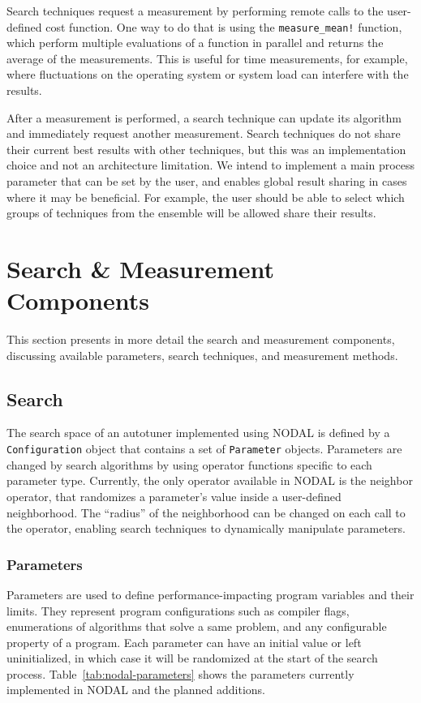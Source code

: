 Search techniques request a measurement by performing remote calls to the
user-defined cost function. One way to do that is using the
\texttt{measure\_mean!} function, which perform multiple evaluations of a
function in parallel and returns the average of the measurements.  This is
useful for time measurements, for example, where fluctuations on the operating
system or system load can interfere with the results.

After a measurement is performed, a search technique can update its algorithm
and immediately request another measurement.  Search techniques do not share
their current best results with other techniques, but this was an
implementation choice and not an architecture limitation.  We intend to
implement a main process parameter that can be set by the user, and enables
global result sharing in cases where it may be beneficial. For example, the
user should be able to select which groups of techniques from the ensemble will
be allowed share their results.

\section{Search \& Measurement Components}
\label{sec:nodal-components}

This section presents in more detail the search and measurement components,
discussing available parameters, search techniques, and measurement methods.

\subsection{Search}

The search space of an autotuner implemented using NODAL is defined by a
\texttt{Configuration} object that contains a set of \texttt{Parameter}
objects. Parameters are changed by search algorithms by using operator
functions specific to each parameter type. Currently, the only operator
available in NODAL is the neighbor operator, that randomizes a parameter's
value inside a user-defined neighborhood. The ``radius'' of the neighborhood
can be changed on each call to the operator, enabling search techniques to
dynamically manipulate parameters.

\subsubsection{Parameters}

Parameters are used to define performance-impacting program variables and their
limits. They represent program configurations such as compiler flags,
enumerations of algorithms that solve a same problem, and any configurable
property of a program. Each parameter can have an initial value or left
uninitialized, in which case it will be randomized at the start of the search
process.  Table~\ref{tab:nodal-parameters} shows the parameters currently
implemented in NODAL and the planned additions.

